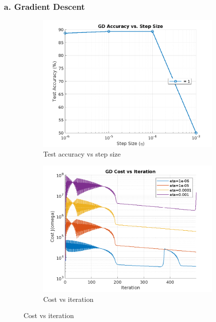 \documentclass{article}
\begin{document}
\subsubsection{a. Gradient Descent}
\begin{figure}[H]
  \centering
  \begin{subfigure}[b]{0.3\textwidth}
    \centering
    \includegraphics[width=\textwidth]{images/gd_accuracy_vs_step_size.png}
    \caption{Test accuracy vs step size}
    \label{fig:step_size_acc_gd}
  \end{subfigure}
  \begin{subfigure}[b]{0.3\textwidth}
    \centering
    \includegraphics[width=\textwidth]{images/gd_cost_vs_iteration.png}
    \caption{Cost vs iteration}

\end{subfigure}
\end{figure}
\end{document}
